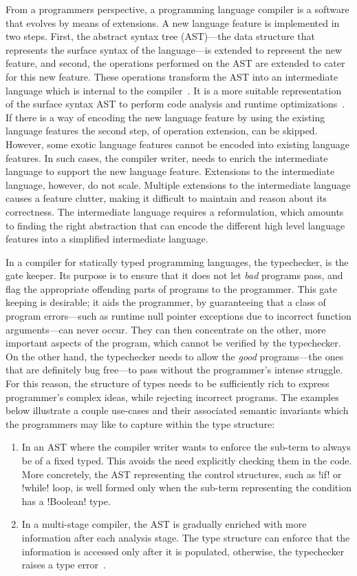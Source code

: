 \documentclass[screen,nonacm,manuscript,review]{acmart} %
\begin{document}
From a programmers perspective, a programming language compiler is
a software that evolves by means of extensions. A new language feature
is implemented in two steps. First, the abstract syntax tree (AST)---the
data structure that represents the surface syntax of the language---is
extended to represent the new feature, and second, the operations
performed on the AST are extended to cater for this new feature. These
operations transform the AST into an intermediate language which is internal to the
compiler~\cite{siek_compilation_2023}. It is a more suitable
representation of the surface syntax AST to perform code analysis and
runtime optimizations~\cite{aho_compilers_1986}.
If there is a way of encoding the new language feature by using the
existing language features the second step, of operation extension, can be
skipped. However, some exotic language features cannot be encoded
into existing language features. In such cases, the compiler writer, needs
to enrich the intermediate language to support the
new language feature. Extensions to the intermediate language,
however, do not scale. Multiple extensions to the intermediate
language causes a feature clutter, making it difficult to
maintain and reason about its correctness. The intermediate language
requires a reformulation, which amounts to finding the right
abstraction that can encode the different high level language features
into a simplified intermediate language.

In a compiler for statically typed programming languages, the
typechecker, is the gate keeper. Its purpose is to ensure that it does
not let \emph{bad} programs pass, and flag the appropriate offending
parts of programs to the programmer. This gate keeping is desirable;
it aids the programmer, by guaranteeing that a class of program
errors---such as runtime null pointer exceptions due to incorrect
function arguments---can never occur. They can then concentrate on the
other, more important aspects of the program, which cannot be verified
by the typechecker. On the other hand, the typechecker needs to allow
the \emph{good} programs---the ones that are definitely bug free---to
pass without the programmer's intense struggle. For
this reason, the structure of types needs to be sufficiently rich
to express programmer's complex ideas, while rejecting incorrect
programs. The examples below illustrate a couple use-cases and
their associated semantic invariants which the programmers may like to
capture within the type structure:
\begin{enumerate}
\item In an AST where the compiler writer wants to enforce the
  sub-term to always be of a fixed typed. This avoids the need
  explicitly checking them in the code.
  More concretely, the AST representing the control structures, such
  as !if! or !while! loop, is well formed only when the sub-term
  representing the condition has a !Boolean! type.
\item In a multi-stage compiler, the AST is gradually enriched with
  more information after each analysis stage. The type structure can
  enforce that the information is accessed only after it is populated,
  otherwise, the typechecker raises a type
  error~\cite{peyton_jones_trees_2017}.
\end{enumerate}
\end{document}
